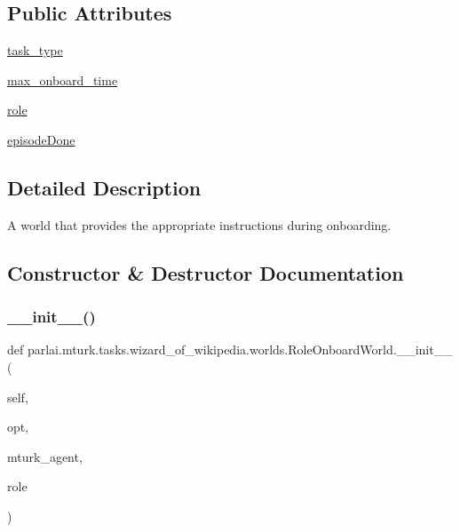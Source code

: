 \subsection*{Public Attributes}
\begin{DoxyCompactItemize}
\item 
\hyperlink{classparlai_1_1mturk_1_1tasks_1_1wizard__of__wikipedia_1_1worlds_1_1RoleOnboardWorld_a9a12f1f9c3e0648d520b5a60103026e2}{task\+\_\+type}
\item 
\hyperlink{classparlai_1_1mturk_1_1tasks_1_1wizard__of__wikipedia_1_1worlds_1_1RoleOnboardWorld_a52544620386fc0dee8de4c1e28223281}{max\+\_\+onboard\+\_\+time}
\item 
\hyperlink{classparlai_1_1mturk_1_1tasks_1_1wizard__of__wikipedia_1_1worlds_1_1RoleOnboardWorld_a23e9dabe75318cc16b819f1868026a71}{role}
\item 
\hyperlink{classparlai_1_1mturk_1_1tasks_1_1wizard__of__wikipedia_1_1worlds_1_1RoleOnboardWorld_a37cf10b9e972e9de5dae2191cbe46c2b}{episode\+Done}
\end{DoxyCompactItemize}


\subsection{Detailed Description}
\begin{DoxyVerb}A world that provides the appropriate instructions during onboarding.
\end{DoxyVerb}
 

\subsection{Constructor \& Destructor Documentation}
\mbox{\label{classparlai_1_1mturk_1_1tasks_1_1wizard__of__wikipedia_1_1worlds_1_1RoleOnboardWorld_acd0e219bbdd512e859e259bbb8c8cb6a}} 
\subsubsection{\texorpdfstring{\+\_\+\+\_\+init\+\_\+\+\_\+()}{\_\_init\_\_()}}
{\footnotesize\ttfamily def parlai.\+mturk.\+tasks.\+wizard\+\_\+of\+\_\+wikipedia.\+worlds.\+Role\+Onboard\+World.\+\_\+\+\_\+init\+\_\+\+\_\+ (\begin{DoxyParamCaption}\item[{}]{self,  }\item[{}]{opt,  }\item[{}]{mturk\+\_\+agent,  }\item[{}]{role }\end{DoxyParamCaption})}



